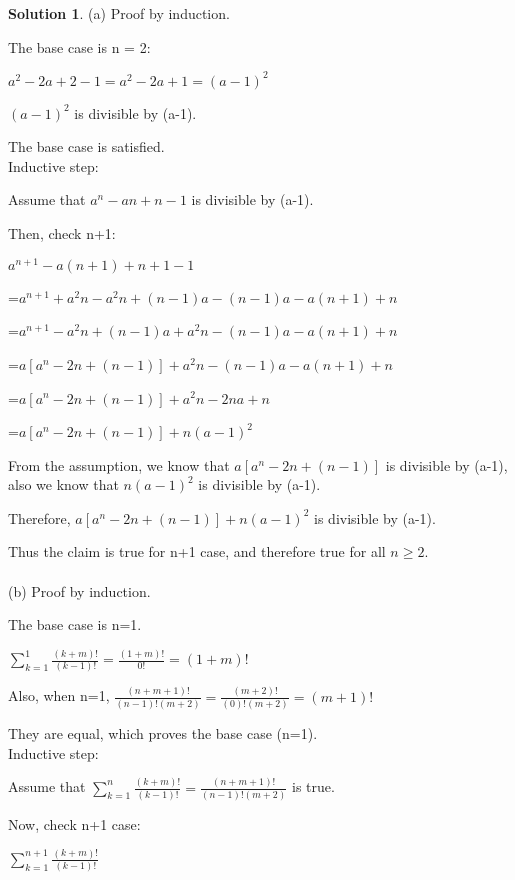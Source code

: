 \documentclass{article}
\theoremstyle{definition}
\newtheorem*{solution}{Solution}
\begin{document}
\begin{solution}
(a) Proof by induction.

The base case is n = 2:

\(a^2 - 2a + 2 - 1 = a^2 - 2a + 1 = (a-1)^2\)

\((a-1)^2\) is divisible by (a-1).

The base case is satisfied.\\

Inductive step:

Assume that \(a^n - an + n - 1\) is divisible by (a-1).

Then, check n+1:

\(a^{n+1} - a(n+1) + n + 1 - 1\)

=\(a^{n+1} + a^2n - a^2n + (n-1)a - (n-1)a - a(n+1) + n\)

=\(a^{n+1} - a^2n + (n-1)a + a^2n - (n-1)a - a(n+1) + n\)

=\(a[a^{n} - 2n + (n-1)] + a^2n - (n-1)a - a(n+1) + n\)

=\(a[a^{n} - 2n + (n-1)] + a^2n -2na + n\)

=\(a[a^{n} - 2n + (n-1)] + n(a-1)^2\)

From the assumption, we know that \(a[a^{n} - 2n + (n-1)]\) is divisible by (a-1), also we know that \(n(a-1)^2\) is divisible by (a-1).

Therefore, \(a[a^{n} - 2n + (n-1)] + n(a-1)^2\) is divisible by (a-1). 

Thus the claim is true for n+1 case, and therefore true for all \(n \ge 2\).\\\\





(b) Proof by induction.

The base case is n=1.

\(\sum_{k=1}^{1}{\frac{(k+m)!}{(k-1)!}} = \frac{(1+m)!}{0!} = (1+m)!\)

Also, when n=1, \(\frac{(n+m+1)!}{(n-1)!(m+2)} = \frac{(m+2)!}{(0)!(m+2)} = (m+1)!\)

They are equal, which proves the base case (n=1).\\

Inductive step:

Assume that \(\sum_{k=1}^{n}{\frac{(k+m)!}{(k-1)!}} = \frac{(n+m+1)!}{(n-1)!(m+2)}\) is true.

Now, check n+1 case:

\(\sum_{k=1}^{n+1}{\frac{(k+m)!}{(k-1)!}}\) 


\end{solution}
\end{document}
